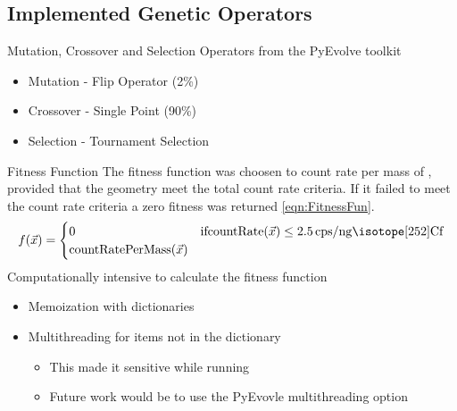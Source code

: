 \subsection{Implemented Genetic Operators}
\begin{frame}[fragile]{Mutation, Crossover and Selection}
  Operators from the PyEvolve toolkit
  \begin{itemize}
    \item Mutation - Flip Operator (2\%)
    \item Crossover - Single Point (90\%)
    \item Selection - Tournament Selection
  \end{itemize}
\end{frame}
\begin{frame}{Fitness Function}
The fitness function was choosen to count rate per mass of , provided that the geometry meet the total count rate criteria.
If it failed to meet the count rate criteria a zero fitness was returned \eqref{eqn:FitnessFun}.
\begin{align}
    \label{eqn:FitnessFun}
    f(\vec{x})
    = \begin{cases}
    0 & \text{if} \text{countRate}(\vec{x}) \leq \SI{2.5}{cps\per\nano\gram\iso[252]{Cf}} \\
    \text{countRatePerMass}(\vec{x})
    \end{cases}
\end{align}
Computationally intensive to calculate the fitness function 
\begin{itemize}
  \item Memoization with dictionaries
  \item Multithreading for items not in the dictionary
  \begin{itemize}
    \item This made it sensitive while running
    \item Future work would be to use the PyEvovle multithreading option
  \end{itemize}
\end{itemize}
\end{frame}
\begin{frame}

\end{frame}
